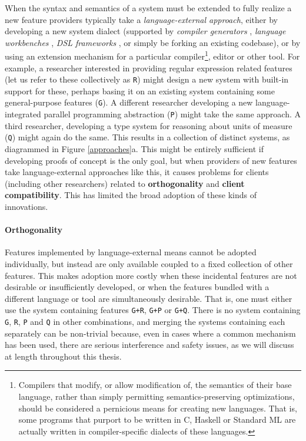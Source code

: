When the syntax and semantics of a system must be extended to fully realize a new feature providers typically take a \emph{language-external approach}, either by developing a new system dialect (supported by \emph{compiler generators} \cite{brooker1963compiler}, \emph{language workbenches} \cite{erdweg2013state}, \emph{DSL frameworks} \cite{fowler2010domain}, or simply be forking an existing codebase), or by using an extension mechanism for a {particular} compiler\footnote{Compilers that modify, or allow modification of, the semantics of their base language, rather than simply permitting semantics-preserving optimizations, should be considered a pernicious means for creating new languages. That is, some programs that purport to be written in C, Haskell or Standard ML are actually written in compiler-specific dialects of these languages.}, editor or other tool. For example, a researcher interested in providing regular expression related features (let us refer to these collectively as \texttt{R}) might design a new system with built-in support for these, perhaps basing it on an existing system containing some general-purpose features (\texttt{G}). A different researcher developing a new language-integrated parallel programming abstraction (\texttt{P}) might  take the same approach. A third researcher, developing a type system for reasoning about units of measure (\texttt{Q}) might again do the same. This results in a collection of distinct systems, as diagrammed in Figure \ref{approaches}a. This might be entirely sufficient if developing proofs of concept is the only goal, but when providers of new features take language-external approaches like this, it causes  problems for clients (including other researchers) related to \textbf{orthogonality} and \textbf{client compatibility}. This has limited the broad adoption of these kinds of innovations.%

\paragraph{Orthogonality} Features implemented by language-external means cannot be adopted individually, but instead are only available coupled to a fixed collection of other features. This makes adoption more costly when these incidental features are  not desirable or insufficiently developed, or when the features bundled with a different language or tool are simultaneously desirable. That is, one must either use the system containing features \texttt{G+R}, \texttt{G+P} or \texttt{G+Q}. There is no system containing \texttt{G}, \texttt{R}, \texttt{P} and \texttt{Q} in other combinations, and merging the systems containing each separately can be non-trivial because, even in cases where a common mechanism has been used, there are serious interference and safety issues, as we will discuss at length throughout this thesis.

